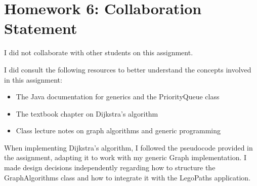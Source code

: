 \documentclass[11pt]{article}
\begin{document}
\section*{Homework 6: Collaboration Statement}

I did not collaborate with other students on this assignment.

I did consult the following resources to better understand the concepts involved in this assignment:
\begin{itemize}
    \item The Java documentation for generics and the PriorityQueue class
    \item The textbook chapter on Dijkstra's algorithm
    \item Class lecture notes on graph algorithms and generic programming
\end{itemize}

When implementing Dijkstra's algorithm, I followed the pseudocode provided in the assignment, adapting it to work with my generic Graph implementation. I made design decisions independently regarding how to structure the GraphAlgorithms class and how to integrate it with the LegoPaths application.
\end{document}
